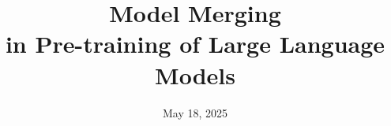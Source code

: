 \documentclass[]{bytedance_seed}
\title{Model Merging \\ in Pre-training of Large Language Models}
\affiliation[]{ByteDance Seed}
\date{May 18, 2025}
\begin{document}
\maketitle









\clearpage




\clearpage

\beginappendix


\end{document}

